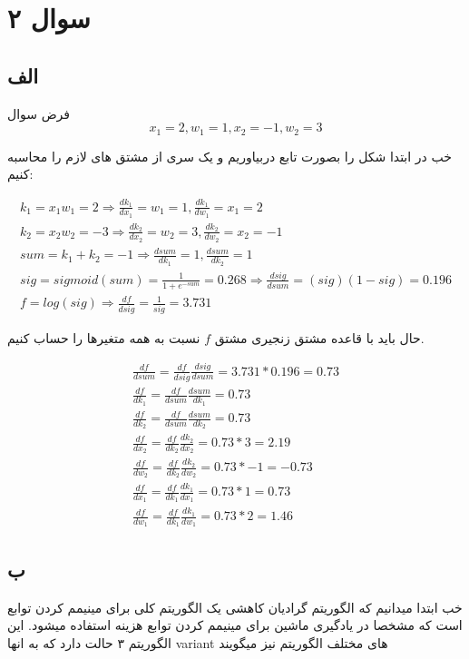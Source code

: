 \documentclass{article}[12pt]
\begin{document}
\clearpage
\section{سوال ۲}

\subsection{الف}
فرض سوال
\begin{equation}
x_1 = 2 , w_1 = 1,x_2 = -1,w_2 = 3
\end{equation}


خب در ابتدا شکل را بصورت تابع دربیاوریم و یک سری از مشتق های لازم را محاسبه کنیم:



\begin{gather}
k_1 = x_1 w_1 = 2 \Rightarrow \frac{dk_1}{dx_1} = w_1 =1 ,
\frac{dk_1}{dw_1} = x_1 = 2 \\
k_2 = x_2 w_2 = -3 \Rightarrow
\frac{dk_2}{dx_2} = w_2 = 3,
\frac{dk_2}{dw_2} = x_2 = -1
 \\
sum = k_1 + k_2 = -1 \Rightarrow 
\frac{dsum}{dk_1} = 1,
\frac{dsum}{dk_2} = 1
\\ 
sig = sigmoid(sum) = \frac{1}{1+e^{-sum}} = 0.268 
\Rightarrow 
\frac{dsig}{dsum} = (sig)(1-sig) = 0.196
\\
f = log(sig) 
\Rightarrow
\frac{df}{dsig} = \frac{1}{sig} = 3.731
\end{gather}

حال باید با قاعده مشتق زنجیری مشتق 
$f$
نسبت به همه متغیرها را حساب کنیم. 

\begin{gather}
\frac{df}{dsum} = \frac{df}{dsig} \frac{dsig}{dsum} = 3.731 * 0.196 = 0.73
\\
\frac{df}{dk_1} = \frac{df}{dsum}\frac{dsum}{dk_1} = 0.73
\\
\frac{df}{dk_2} = \frac{df}{dsum}\frac{dsum}{dk_2} = 0.73
\\
\frac{df}{dx_2} = \frac{df}{dk_2} \frac{dk_2}{dx_2} = 
0.73 * 3 = 2.19
\\
\frac{df}{dw_2} = \frac{df}{dk_2} \frac{dk_2}{dw_2} = 
0.73 * -1 = - 0.73
\\
\frac{df}{dx_1} = \frac{df}{dk_1} \frac{dk_1}{dx_1} = 
0.73 * 1 = 0.73
\\
\frac{df}{dw_1} = \frac{df}{dk_1} \frac{dk_1}{dw_1} = 
0.73 * 2 = 1.46  
\end{gather}

\clearpage
\subsection{ب}
خب ابتدا میدانیم که الگوریتم گرادیان کاهشی یک الگوریتم کلی برای مینیمم کردن توابع است که مشخصا در یادگیری ماشین برای مینیمم کردن توابع هزینه 
استفاده میشود. 
این الگوریتم ۳ حالت دارد که به انها 
variant
های مختلف الگوریتم نیز میگویند
\end{document}
